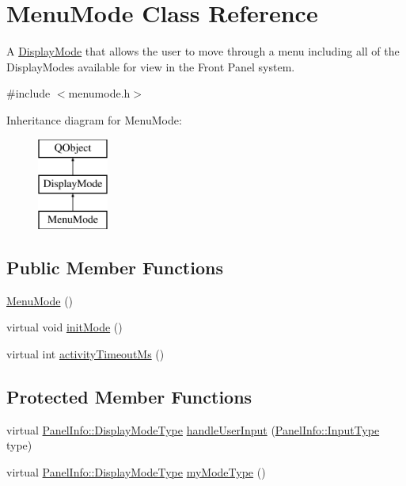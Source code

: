 \hypertarget{class_menu_mode}{\section{Menu\-Mode Class Reference}
\label{class_menu_mode}
}


A \hyperlink{class_display_mode}{Display\-Mode} that allows the user to move through a menu including all of the Display\-Modes available for view in the Front Panel system.  




{\ttfamily \#include $<$menumode.\-h$>$}

Inheritance diagram for Menu\-Mode\-:\begin{figure}[H]
\begin{center}
\leavevmode
\includegraphics[height=3.000000cm]{class_menu_mode}
\end{center}
\end{figure}
\subsection*{Public Member Functions}
\begin{DoxyCompactItemize}
\item 
\hyperlink{class_menu_mode_ade6be821ba40792588697e58edfeff07}{Menu\-Mode} ()
\item 
virtual void \hyperlink{class_menu_mode_ab022c00df508989d4687a19d397dc3f6}{init\-Mode} ()
\item 
virtual int \hyperlink{class_menu_mode_ab91ab463bdf09a21ea3783fc0f284f4c}{activity\-Timeout\-Ms} ()
\end{DoxyCompactItemize}
\subsection*{Protected Member Functions}
\begin{DoxyCompactItemize}
\item 
virtual \hyperlink{namespace_panel_info_adb8b98e092c15e831aa524d39701d565}{Panel\-Info\-::\-Display\-Mode\-Type} \hyperlink{class_menu_mode_ad4a3f4a11d3f85417e074c5b2c05e21a}{handle\-User\-Input} (\hyperlink{namespace_panel_info_aeeb3b627166cd15c3898f93a1a499c65}{Panel\-Info\-::\-Input\-Type} type)
\item 
virtual \hyperlink{namespace_panel_info_adb8b98e092c15e831aa524d39701d565}{Panel\-Info\-::\-Display\-Mode\-Type} \hyperlink{class_menu_mode_aaecee7eee391908a83e43d8bac505033}{my\-Mode\-Type} ()
\end{DoxyCompactItemize}

